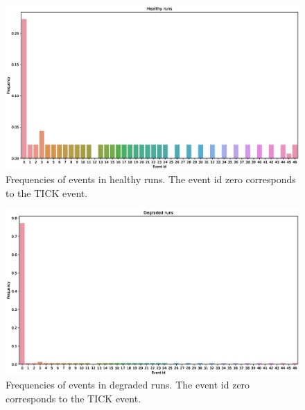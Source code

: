 \documentclass[journal]{IEEEtran}
\begin{document}
\begin{figure}[tb]
 \centering
 \includegraphics[width=8 cm,keepaspectratio=true]{./healthy_runs_data_histogram.eps}
 \caption{Frequencies of events in healthy runs. The event id zero corresponds to the TICK event.}
 \label{figure:healthy_histogram}
\end{figure}

\begin{figure}[tb]
 \centering
 \includegraphics[width=8 cm,keepaspectratio=true]{./degraded_runs_data_histogram.eps}
 \caption{Frequencies of events in degraded runs. The event id zero corresponds to the TICK event.}
 \label{figure:degraded_histogram}
\end{figure}
\end{document}
